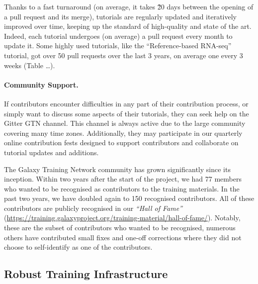 \documentclass[10pt,letterpaper]{article}
\begin{document}
Thanks to a fast turnaround (on average, it takes \~20 days between the opening of a pull request and its merge), tutorials are regularly updated and iteratively improved over time, keeping up the standard of high-quality and state of the art.
Indeed, each tutorial undergoes (on average) a pull request every month to update it. Some highly used tutorials, like the “Reference-based RNA-seq” tutorial, got over 50 pull requests over the last 3 years, on average one every 3 weeks (Table …).


\paragraph*{Community Support.} If contributors encounter difficulties in any part of their contribution process, or simply want to discuss some aspects of their tutorials, they can seek help on the Gitter GTN channel. This channel is always active due to the large community covering many time zones.
Additionally, they may participate in our quarterly online contribution fests designed to support contributors and collaborate on tutorial updates and additions.

The Galaxy Training Network community has grown significantly since its inception.
Within two years after the start of the project, we had 77 members who wanted to be recognised as contributors to the training materials.
In the past two years, we have doubled again to 150 recognised contributors.
All of these contributors are publicly recognised in our \emph{“Hall of Fame”} (\url{https://training.galaxyproject.org/training-material/hall-of-fame/}).
Notably, these are the subset of contributors who wanted to be recognised, numerous others have contributed small fixes and one-off corrections where they did not choose to self-identify as one of the contributors.



\subsection*{Robust Training Infrastructure}
\end{document}
